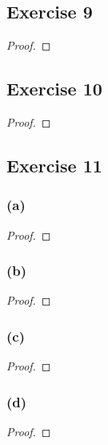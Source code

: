 \documentclass[14pt]{extarticle}
\begin{document}
\subsection{Exercise 9}

\begin{proof}

\end{proof}

\subsection{Exercise 10}

\begin{proof}

\end{proof}

\subsection{Exercise 11}

\subsubsection{(a)}

\begin{proof}

\end{proof}

\subsubsection{(b)}

\begin{proof}

\end{proof}

\subsubsection{(c)}

\begin{proof}

\end{proof}

\subsubsection{(d)}

\begin{proof}

\end{proof}
\end{document}
